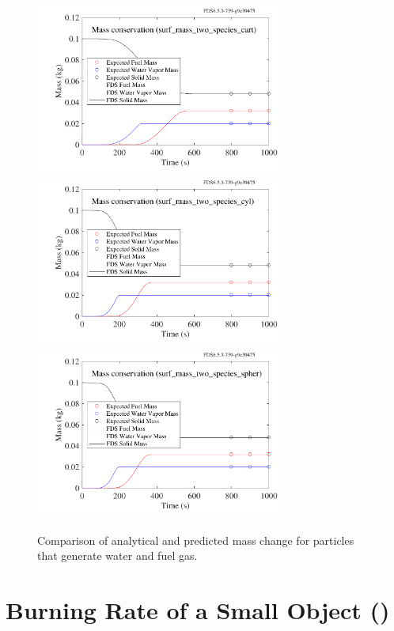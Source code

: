 \documentclass[11pt]{book}
\begin{document}
\begin{figure}[!htb]
\centering
\includegraphics[width=3.2in]{SCRIPT_FIGURES/surf_mass_two_species_cart} \\
\includegraphics[width=3.2in]{SCRIPT_FIGURES/surf_mass_two_species_cyl} \\
\includegraphics[width=3.2in]{SCRIPT_FIGURES/surf_mass_two_species_spher}
\caption[The  test cases]{Comparison of analytical and predicted mass change for particles that generate water and fuel gas.}
\label{surf_mass_two_species}
\end{figure}

\clearpage




\section{Burning Rate of a Small Object (\texorpdfstring{}{cell\_burn\_away})}
\label{cell_burn_away}
\end{document}
